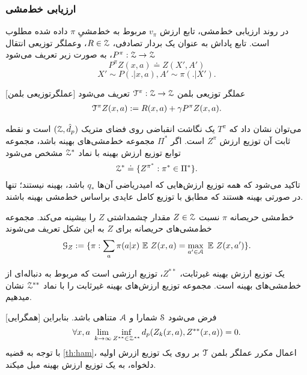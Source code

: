 \subsubsection{ارزیابی خط‌مشی}
در روند ارزیابی خط‌مشی، تابع ارزش
$v_\pi$
مربوط به خط‌مشیِ $\pi$ داده شده مطلوب است.
تابع پاداش به عنوان یک بردار تصادفی، 
$R \in \EuScript{Z}$،
وعملگر توزیعی انتقال 
$P^\pi : \EuScript{Z} \rightarrow \EuScript{Z}$،
به صورت زیر تعریف می‌شود
$$P^{\pi} Z(x,a) \doteq Z(X',A')$$
$$X' \sim P(.|x,a), A'\sim \pi (.|X').$$

[عملگرتوزیعی بلمن]
عملگر توزیعی بلمن $\EuScript{T}^\pi : \EuScript{Z} \rightarrow \EuScript{Z}$ تعریف می‌شود
\begin{align}
\EuScript{T}^\pi Z(x,a) := R(x,a)+ \gamma P^\pi Z(x,a).
\end{align}  



می‌توان نشان داد که $T^\pi$ یک نگاشت انقباضی 
روی فضای متریک
$(\EuScript{Z},\hat{d}_p)$
است و نقطه ثابت آن توزیع ارزش 
$Z^\pi$
است.
اگر 
$\Pi^*$
مجموعه‌ خط‌مشی‌های بهینه باشد، 
مجموعه توابع توزیع ارزش بهینه با نماد $\EuScript{Z}^*$ مشخص می‌شود
$$\EuScript{Z}^* \doteq \{{Z^{\pi^{*}} : \pi^* \in \Pi^*\} }.$$
تاکید می‌شود که همه توزیع ارزش‌هایی که امیدریاضی آن‌ها
 $q_*$ 
باشد، بهینه نیستند؛ تنها در صورتی بهینه هستند که مطابق با توزیع کامل عایدی بر‌اساس خط‌مشی بهینه باشند.

خط‌مشی حریصانه
$\pi$
نسبت
$Z \in \EuScript{Z}$
مقدار چشمداشتی
$Z$
 را بیشینه می‌کند.
 مجموعه خط‌مشی‌های حریصانه برای 
 $Z$
 به این شکل تعریف می‌شوند
 $$\EuScript{G}_Z := \lbrace \pi : \sum_{a} \pi (a|x) \ \mathbb{E} \ Z(x,a) = \max_{a' \in \EuScript{A}} \ \mathbb{E} \ Z(x,a') \rbrace.$$

یک توزیع ارزش بهینه غیرثابت، $Z^{**}$، توزیع ارزشی‌ است که مربوط به دنباله‌ای از خط‌مشی‌های بهینه است. مجموعه‌ توزیع ارزش‌های بهینه غیرثابت را با نماد
$ \EuScript{Z}^{**} $
نشان می\nf دهیم.

[همگرایی]
فرض می‌شود 
$\EuScript{S}$
شمارا و 
$\EuScript{A}$
متناهی باشد.
بنابراین
$$\forall x,a  \ \lim_{k\to\infty} \inf_{Z^{**} \in \EuScript{Z}^{**}} d_p (Z_k (x,a), Z^{**}(x,a)) = 0.$$
\label{th:ham}
با توجه به قضیه 
\ref{th:ham}،
اعمال مکرر عملگر بلمن
$\EuScript{T}$
بر روی یک توزیع ازرش اولیه دلخواه، به یک توزیع ارزش بهینه میل می\nf کند.
%
